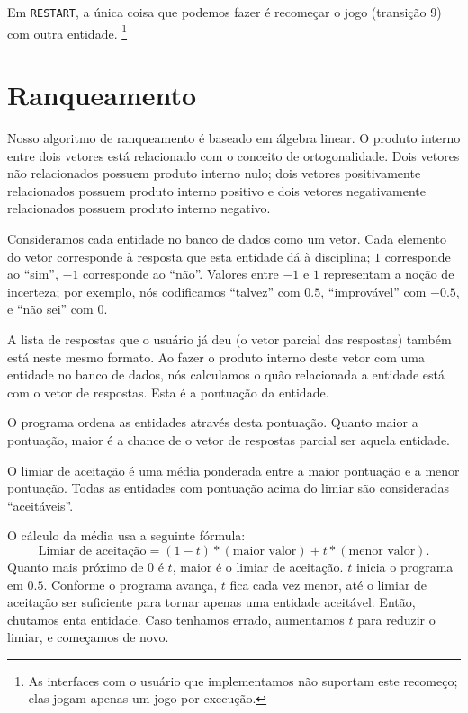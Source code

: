 \documentclass{article}
\newcommand{\restart}{\lstinline"RESTART"}
\begin{document}
Em \restart, a única coisa que podemos fazer é recomeçar o jogo
(transição 9)
com outra entidade.
\footnote{
    As interfaces com o usuário que implementamos
    não suportam este recomeço;
    elas jogam apenas um jogo por execução.
}

\section{Ranqueamento \label{ranqueamento}}

Nosso algoritmo de ranqueamento é baseado em álgebra linear.
O produto interno entre dois vetores está relacionado com o conceito de ortogonalidade.
Dois vetores não relacionados possuem produto interno nulo;
dois vetores positivamente relacionados possuem produto interno positivo
e dois vetores negativamente relacionados possuem produto interno negativo.

Consideramos cada entidade no banco de dados como um vetor.
Cada elemento do vetor corresponde à resposta que esta entidade dá à disciplina;
$1$ corresponde ao ``sim'', $-1$ corresponde ao ``não''.
Valores entre $-1$ e $1$ representam a noção de incerteza;
por exemplo, nós codificamos ``talvez'' com $0.5$,
``improvável'' com $-0.5$, e ``não sei'' com $0$.

A lista de respostas que o usuário já deu
(o vetor parcial das respostas)
também está neste mesmo formato.
Ao fazer o produto interno deste vetor com uma entidade no banco de dados,
nós calculamos o quão relacionada a entidade está com o vetor de respostas.
Esta é a pontuação da entidade.

O programa ordena as entidades através desta pontuação.
Quanto maior a pontuação, maior é a chance de o vetor de respostas parcial
ser aquela entidade.

O limiar de aceitação é uma média ponderada entre a maior pontuação
e a menor pontuação.
Todas as entidades com pontuação acima do limiar são consideradas
``aceitáveis''.

O cálculo da média usa a seguinte fórmula:
\begin{equation}
    \text{Limiar de aceitação} =
    (1-t) * (\text{maior valor}) + t * (\text{menor valor}).
\end{equation}
Quanto mais próximo de $0$ é $t$, maior é o limiar de aceitação.
$t$ inicia o programa em $0.5$.
Conforme o programa avança,
$t$ fica cada vez menor,
até o limiar de aceitação ser suficiente para tornar apenas uma entidade aceitável.
Então, chutamos enta entidade.
Caso tenhamos errado, aumentamos $t$ para reduzir o limiar,
e começamos de novo.
\end{document}
